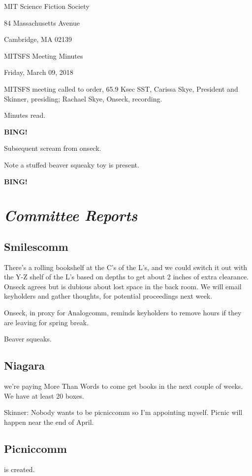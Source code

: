 \documentclass[10pt]{article}
\newcommand{\bing}{{\bf BING!} }
\newcommand{\goto}[1]{\bing \vskip 12pt \section*{{\em{#1}}}}
\newcommand{\skinner}{Carissa Skye, President and Skinner}
\newcommand{\onseck}{Rachael Skye, Onseck}
\newcommand{\meetingdate}{Friday, March 09, 2018 }
\begin{document}
\begin{center}

MIT Science Fiction Society

84 Massachusetts Avenue

Cambridge, MA 02139

\vspace{12pt}

MITSFS Meeting Minutes

\meetingdate

\end{center}

\vspace{18pt}

\setlength{\parskip}{6pt}

\noindent
MITSFS meeting called to order, 65.9 Ksec SST,
\skinner, presiding; \onseck, recording.

Minutes read.

\bing

Subsequent scream from onseck.

Note a stuffed beaver squeaky toy is present.

\goto{Committee Reports}
\subsection{Smilescomm} 
There's a rolling bookshelf at the C's of the L's, and we could switch it out with the Y-Z shelf of the L's based on depths to get about 2 inches of extra clearance. Onseck agrees but is dubious about lost space in the back room. We will email keyholders and gather thoughts, for potential proceedings next week.

Onseck, in proxy for Analogcomm, reminds keyholders to remove hours if they are leaving for spring break.

Beaver squeaks.

\subsection{Niagara}
we're paying More Than Words to come get books in the next couple of weeks. We have at least 20 boxes.

Skinner: Nobody wants to be picniccomm so I'm appointing myself. Picnic will happen near the end of April.

\subsection{Picniccomm}
 is created.
\end{document}
